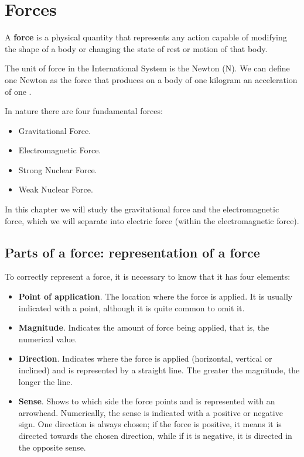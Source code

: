 


\section{Forces}
\begin{definition}[Force]
        A \textbf{force} is a physical quantity that represents any action capable of modifying the shape of a body or changing the state of rest or motion of that body.
\end{definition}
The unit of force in the International System is the Newton (\unit{\newton}).
We can define one Newton as the force that produces on a body of one kilogram an acceleration of one \unit{\mpss}.

In nature there are four fundamental forces:
\begin{itemize}
    \item Gravitational Force.
    \item Electromagnetic Force.
    \item Strong Nuclear Force.
    \item Weak Nuclear Force.
\end{itemize}

In this chapter we will study the gravitational force and the electromagnetic force, which we will separate into electric force (within the electromagnetic force).

\subsection{Parts of a force: representation of a force}

To correctly represent a force, it is necessary to know that it has four elements:

\begin{itemize}
    \item \textbf{Point of application}.
    The location where the force is applied.
    It is usually indicated with a point, although it is quite common to omit it.
    \item \textbf{Magnitude}.
    Indicates the amount of force being applied, that is, the numerical value.
    \item \textbf{Direction}.
    Indicates where the force is applied (horizontal, vertical or inclined) and is represented by a straight line.
    The greater the magnitude, the longer the line.
    \item \textbf{Sense}.
    Shows to which side the force points and is represented with an arrowhead.
    Numerically, the sense is indicated with a positive or negative sign.
    One direction is always chosen; if the force is positive, it means it is directed towards the chosen direction, while if it is negative, it is directed in the opposite sense.
\end{itemize}

